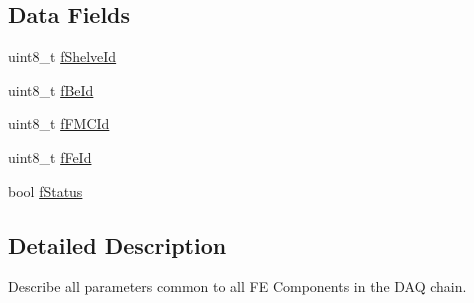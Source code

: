 \subsection*{Data Fields}
\begin{DoxyCompactItemize}
\item 
uint8\-\_\-t \hyperlink{class_ph2___hw_description_1_1_front_end_description_a7ce5e0acdcb5647bb94f09ec480e8155}{f\-Shelve\-Id}
\item 
uint8\-\_\-t \hyperlink{class_ph2___hw_description_1_1_front_end_description_a9ad4c11d4b00f0e1325843cfceac2e7c}{f\-Be\-Id}
\item 
uint8\-\_\-t \hyperlink{class_ph2___hw_description_1_1_front_end_description_a4f17ee7ee9d0d395c9f7da5ab3c8f424}{f\-F\-M\-C\-Id}
\item 
uint8\-\_\-t \hyperlink{class_ph2___hw_description_1_1_front_end_description_a11b388f8d0f3259e5355779b36e75d9f}{f\-Fe\-Id}
\item 
bool \hyperlink{class_ph2___hw_description_1_1_front_end_description_a719dce1ef5c6656fd71ae91f6f404053}{f\-Status}
\end{DoxyCompactItemize}


\subsection{Detailed Description}
Describe all parameters common to all F\-E Components in the D\-A\-Q chain. 

